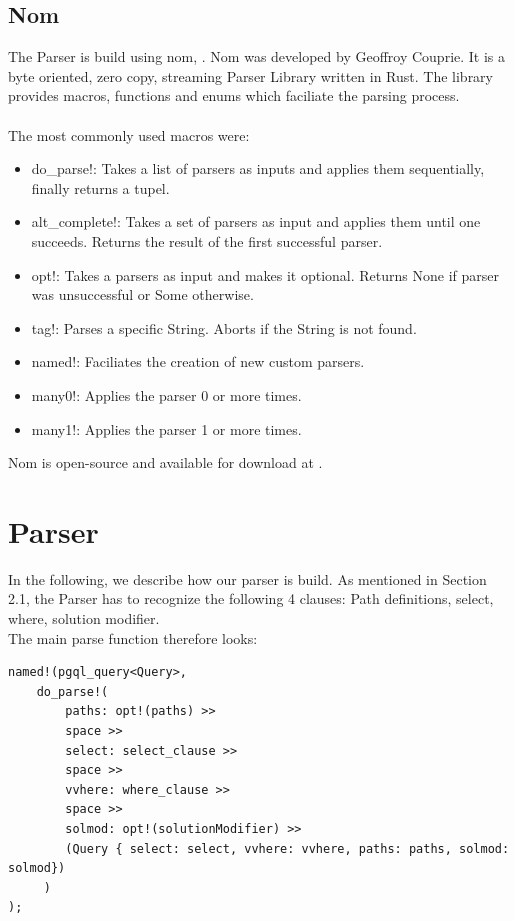 \documentclass[11pt,singlecolumn]{scrartcl}
\begin{document}
\subsection{Nom}
The Parser is build using nom, \cite {Nom}. Nom was developed by Geoffroy Couprie. It is a byte oriented, zero copy, streaming Parser Library written in Rust. The library provides macros, functions and enums which faciliate the parsing process.\\\\
The most commonly used macros were:
\begin{itemize} 
\item do\_parse!: Takes a list of parsers as inputs and applies them sequentially, finally returns a tupel.
\item alt\_complete!: Takes a set of parsers as input and applies them until one succeeds. Returns the result of the first successful parser.
\item opt!: Takes a parsers as input and makes it optional. Returns None if parser was unsuccessful or Some otherwise.
\item tag!: Parses a specific String. Aborts if the String is not found.
\item named!: Faciliates the creation of new custom parsers.
\item many0!: Applies the parser 0 or more times.
\item many1!: Applies the parser 1 or more times. 
\end{itemize}

Nom is open-source and available for download at \cite{GitNom}.

\clearpage

\section{Parser}
In the following, we describe how our parser is build. As mentioned in Section 2.1, the Parser has to recognize the following 4 clauses: Path definitions, select, where, solution modifier.
\\The main parse function therefore looks:
\begin{lstlisting}
named!(pgql_query<Query>,
	do_parse!(
		paths: opt!(paths) >>
		space >>
		select: select_clause >>
		space >>
		vvhere: where_clause >>
		space >>
		solmod: opt!(solutionModifier) >>
		(Query { select: select, vvhere: vvhere, paths: paths, solmod: solmod})
     )
);
 \end{lstlisting} 
\clearpage
\end{document}
